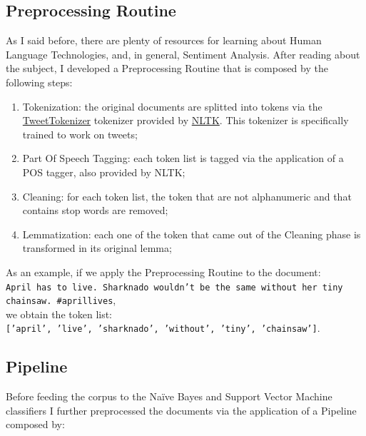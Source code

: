 \documentclass[11pt,twocolumn]{article}
\begin{document}
        \subsection{Preprocessing Routine} %
        \label{sub:preprocessing_routine}
            As I said before, there are plenty of resources for learning about Human Language Technologies, and,
            in general, Sentiment Analysis. After reading about the subject, I developed a Preprocessing
            Routine that is composed by the following steps:

            \begin{enumerate}
                \item Tokenization: the original documents are splitted into tokens via the
                \href{https://www.nltk.org/api/nltk.tokenize.html#module-nltk.tokenize}{TweetTokenizer}
                tokenizer provided by \href{https://www.nltk.org/py-modindex.html}{NLTK}. This tokenizer is
                specifically trained to work on tweets;
                \item Part Of Speech Tagging: each token list is tagged via the application of a POS
                tagger, also provided by NLTK;
                \item Cleaning: for each token list, the token that are not alphanumeric and that contains
                stop words are removed;
                \item Lemmatization: each one of the token that came out of the Cleaning phase is transformed
                in its original lemma;
            \end{enumerate}

            \noindent
            As an example, if we apply the Preprocessing Routine to the document:\\

            \noindent
            \texttt{April has to live. Sharknado wouldn't be the same without her tiny chainsaw. \#aprillives},
            \\

            \noindent
            we obtain the token list: \\

            \noindent
            \texttt{['april', 'live', 'sharknado', 'without', 'tiny', 'chainsaw']}.

        \subsection{Pipeline} %
        \label{sub:pipeline}
            Before feeding the corpus to the Naïve Bayes and Support Vector Machine classifiers I further
            preprocessed the documents via the application of a Pipeline composed by:
\end{document}
